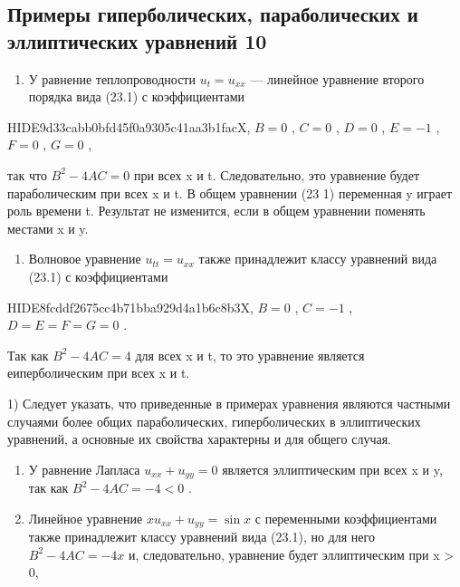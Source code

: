\documentclass[
  ukrainian,
]{article}
\providecommand{\tightlist}{%
  \setlength{\itemsep}{0pt}\setlength{\parskip}{0pt}}
\begin{document}
\subsection{Примеры гиперболических, параболических и эллиптических
уравнений
10}\label{ux43fux440ux438ux43cux435ux440ux44b-ux433ux438ux43fux435ux440ux431ux43eux43bux438ux447ux435ux441ux43aux438ux445-ux43fux430ux440ux430ux431ux43eux43bux438ux447ux435ux441ux43aux438ux445-ux438-ux44dux43bux43bux438ux43fux442ux438ux447ux435ux441ux43aux438ux445-ux443ux440ux430ux432ux43dux435ux43dux438ux439-10}

\begin{enumerate}
\def\labelenumi{\arabic{enumi}.}
\tightlist
\item
  У равнение теплопроводности \(u_t = u_{xx}\) --- линейное уравнение
  второго порядка вида (23.1) с коэффициентами
\end{enumerate}

HIDE9d33cabb0bfd45f0a9305c41aa3b1facX, \(B=0\) , \(C=0\) , \(D=0\) ,
\(E=-1\) , \(F=0\) , \(G=0\) ,

так что \(B^2-4AC=0\) при всех x и t. Следовательно, это уравнение будет
параболическим при всех x и t. В общем уравнении (23 1) переменная y
играет роль времени t. Результат не изменится, если в общем уравнении
поменять местами x и y.

\begin{enumerate}
\def\labelenumi{\arabic{enumi}.}
\setcounter{enumi}{1}
\tightlist
\item
  Волновое уравнение \(u_{tt} = u_{xx}\) также принадлежит классу
  уравнений вида (23.1) с коэффициентами
\end{enumerate}

HIDE8fcddf2675cc4b71bba929d4a1b6c8b3X, \(B=0\) , \(C=-1\) ,
\(D=E=F=G=0\) .

Так как \(B^2 - 4AC = 4\) для всех x и t, то это уравнение является
еиперболическим при всех x и t.

1) Следует указать, что приведенные в примерах уравнения являются
частными случаями более общих параболических, гиперболических в
эллиптических уравнений, а основные их свойства характерны и для общего
случая.

\begin{enumerate}
\def\labelenumi{\arabic{enumi}.}
\setcounter{enumi}{2}
\item
  У равнение Лапласа \(u_{xx} + u_{yy} = 0\) является эллиптическим при
  всех x и y, так как \(B^2 - 4AC = -4 < 0\) .
\item
  Линейное уравнение \(xu_{xx} + u_{yy} = \sin x\) с переменными
  коэффициентами также принадлежит классу уравнений вида (23.1), но для
  него \(B^2-4AC=-4x\) и, следовательно, уравнение будет эллиптическим
  при x \textgreater{} 0,
\end{enumerate}
\end{document}
